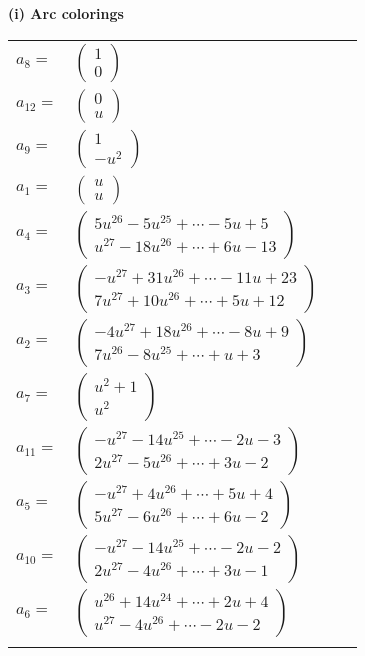 \documentclass[1p]{elsarticle_modified}
\theoremstyle{definition}
\begin{document}
\flushleft \textbf{(i) Arc colorings}\\
\begin{tabular}{m{7pt} m{180pt} m{7pt} m{180pt} }
\flushright $a_{8}=$&$\begin{pmatrix}1\\0\end{pmatrix}$ \\
\flushright $a_{12}=$&$\begin{pmatrix}0\\u\end{pmatrix}$ \\
\flushright $a_{9}=$&$\begin{pmatrix}1\\- u^2\end{pmatrix}$ \\
\flushright $a_{1}=$&$\begin{pmatrix}u\\u\end{pmatrix}$ \\
\flushright $a_{4}=$&$\begin{pmatrix}5 u^{26}-5 u^{25}+\cdots-5 u+5\\u^{27}-18 u^{26}+\cdots+6 u-13\end{pmatrix}$ \\
\flushright $a_{3}=$&$\begin{pmatrix}- u^{27}+31 u^{26}+\cdots-11 u+23\\7 u^{27}+10 u^{26}+\cdots+5 u+12\end{pmatrix}$ \\
\flushright $a_{2}=$&$\begin{pmatrix}-4 u^{27}+18 u^{26}+\cdots-8 u+9\\7 u^{26}-8 u^{25}+\cdots+u+3\end{pmatrix}$ \\
\flushright $a_{7}=$&$\begin{pmatrix}u^2+1\\u^2\end{pmatrix}$ \\
\flushright $a_{11}=$&$\begin{pmatrix}- u^{27}-14 u^{25}+\cdots-2 u-3\\2 u^{27}-5 u^{26}+\cdots+3 u-2\end{pmatrix}$ \\
\flushright $a_{5}=$&$\begin{pmatrix}- u^{27}+4 u^{26}+\cdots+5 u+4\\5 u^{27}-6 u^{26}+\cdots+6 u-2\end{pmatrix}$ \\
\flushright $a_{10}=$&$\begin{pmatrix}- u^{27}-14 u^{25}+\cdots-2 u-2\\2 u^{27}-4 u^{26}+\cdots+3 u-1\end{pmatrix}$ \\
\flushright $a_{6}=$&$\begin{pmatrix}u^{26}+14 u^{24}+\cdots+2 u+4\\u^{27}-4 u^{26}+\cdots-2 u-2\end{pmatrix}$\\&\end{tabular}
\end{document}
